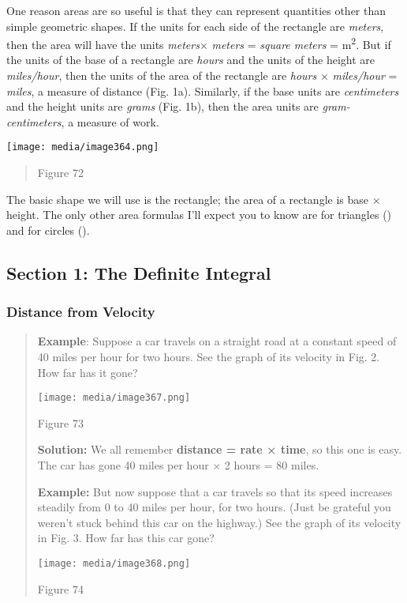 One reason areas are so useful is that they can represent quantities
other than simple geometric shapes. If the units for each side of the
rectangle are \emph{meters}, then the area will have the units
\emph{meters}× \emph{meters} = \emph{square meters} =
m\textsuperscript{2}. But if the units of the base of a rectangle are
\emph{hours} and the units of the height are \emph{miles/hour}, then the
units of the area of the rectangle are \emph{hours} × \emph{miles/hour}
= \emph{miles}, a measure of distance (Fig. 1a). Similarly, if the base
units are \emph{centimeters} and the height units are \emph{grams} (Fig.
1b), then the area units are \emph{gram-centimeters}, a measure of work.

\texttt{[image: media/image364.png]}

\begin{quote}
Figure 72
\end{quote}

The basic shape we will use is the rectangle; the area of a rectangle is
base × height. The only other area formulas I'll expect you to know are
for triangles () and for circles ().

\hypertarget{section-1-the-definite-integral}{\subsection{Section 1: The
Definite Integral}\label{section-1-the-definite-integral}}

\subsubsection{Distance from Velocity}\label{distance-from-velocity}

\begin{quote}
\textbf{Example}: Suppose a car travels on a straight road at a constant
speed of 40 miles per hour for two hours. See the graph of its velocity
in Fig. 2. How far has it gone?

\texttt{[image: media/image367.png]}

Figure 73

\textbf{Solution:} We all remember \textbf{distance = rate × time}, so
this one is easy. The car has gone 40 miles per hour × 2 hours = 80
miles.

\textbf{Example:} But now suppose that a car travels so that its speed
increases steadily from 0 to 40 miles per hour, for two hours. (Just be
grateful you weren't stuck behind this car on the highway.) See the
graph of its velocity in Fig. 3. How far has this car gone?

\texttt{[image: media/image368.png]}

Figure 74
\end{quote}

